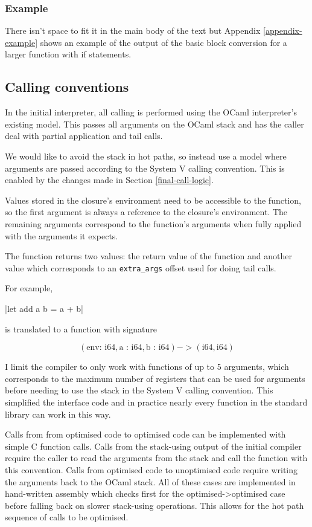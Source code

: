 \subsubsection{Example}

There isn't space to fit it in the main body of the text but Appendix \ref{appendix-example} shows
an example of the output of the basic block conversion for a larger function with if statements.

\subsection{Calling conventions}

In the initial interpreter, all calling is performed using the OCaml interpreter's existing model.
This
passes all arguments on the OCaml stack and has the caller deal with partial application and tail
calls.

We would like to avoid the stack in hot paths, so instead use a model where arguments are passed
according to the
System V calling convention. This is enabled by the changes made in Section \ref{final-call-logic}.

Values stored in the closure's environment need to be accessible to the function, so the first
argument is always a reference to the closure's environment. The remaining arguments correspond to
the function's arguments when fully applied with the arguments it expects.

The function returns two values: the return value of the function and another value which
corresponds to an \texttt{extra\_args} offset used for doing tail calls.

For example,

|let add a b = a + b|

\noindent
is translated to a function with signature

\[(\text{env: i64}, \text{a : i64}, \text{b : i64}) -> (\text{i64}, \text{i64})\]

\noindent
I limit the compiler to only work with functions of up to 5 arguments, which corresponds to the
maximum number of registers that can be used for arguments before needing to use the stack in the
System V calling convention. This simplified the interface code and in practice nearly every
function in the standard library can work in this way.

Calls from from optimised code to optimised code can be implemented with simple C function calls.
Calls from the stack-using output of the initial compiler require the caller to read the arguments
from the stack and call the function with this convention. Calls from optimised code to unoptimised
code require writing the arguments back to the OCaml stack. All of these cases are implemented in
hand-written assembly which checks first for the optimised->optimised case before falling back on
slower
stack-using operations. This allows for the hot path sequence of calls to be optimised.

